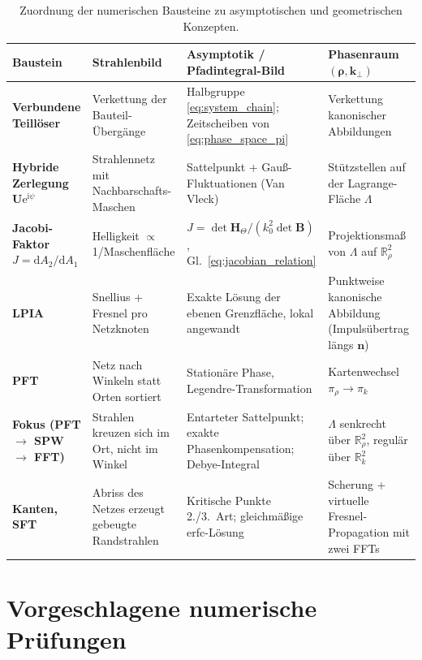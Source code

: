 \documentclass[11pt,a4paper]{scrartcl}
\theoremstyle{insightstyle}
\newcommand{\dd}{\mathrm{d}}
\newcommand{\ii}{\mathrm{i}}
\newcommand{\ee}{\mathrm{e}}
\newcommand{\R}{\mathbb{R}}
\newcommand{\Hess}{\bm{H}}
\newcommand{\rh}{\bm{\rho}}
\newcommand{\kp}{\bm{k}_\perp}
\begin{document}
\begin{table}[htbp]
\centering
\renewcommand{\arraystretch}{1.35}
\small
\begin{tabularx}{\textwidth}{>{\raggedright\arraybackslash\bfseries}p{2.9cm} >{\raggedright\arraybackslash}X >{\raggedright\arraybackslash}X >{\raggedright\arraybackslash}X}
\toprule
Baustein & Strahlenbild & Asymptotik / Pfadintegral-Bild & Phasenraum $(\rh,\kp)$\\
\midrule
Verbundene Teillöser & Verkettung der Bauteil-Übergänge & Halbgruppe \eqref{eq:system_chain}; Zeitscheiben von \eqref{eq:phase_space_pi} & Verkettung kanonischer Abbildungen\\
\addlinespace
Hybride Zerlegung $\bm U\ee^{\ii\psi}$ & Strahlennetz mit Nachbarschafts-Maschen & Sattelpunkt + Gauß-Fluktuationen (Van Vleck) & Stützstellen auf der Lagrange-Fläche $\Lambda$\\
\addlinespace
Jacobi-Faktor $J=\dd A_2/\dd A_1$ & Helligkeit $\propto$ 1/Maschenfläche & $J=\det\Hess_\Theta/(k_0^2\det\bm B)$, Gl.~\eqref{eq:jacobian_relation} & Projektionsmaß von $\Lambda$ auf $\R^2_\rho$\\
\addlinespace
LPIA & Snellius + Fresnel pro Netzknoten & Exakte Lösung der ebenen Grenzfläche, lokal angewandt & Punktweise kanonische Abbildung (Impulsübertrag längs $\bm n$)\\
\addlinespace
PFT & Netz nach Winkeln statt Orten sortiert & Stationäre Phase, Legendre-Transformation & Kartenwechsel $\pi_\rho\to\pi_k$\\
\addlinespace
Fokus (PFT $\to$ SPW $\to$ FFT) & Strahlen kreuzen sich im Ort, nicht im Winkel & Entarteter Sattelpunkt; exakte Phasenkompensation; Debye-Integral & $\Lambda$ senkrecht über $\R^2_\rho$, regulär über $\R^2_k$\\
\addlinespace
Kanten, SFT & Abriss des Netzes erzeugt gebeugte Randstrahlen & Kritische Punkte 2./3.~Art; gleichmäßige erfc-Lösung & Scherung + virtuelle Fresnel-Propagation mit zwei FFTs\\
\bottomrule
\end{tabularx}
\caption{Zuordnung der numerischen Bausteine zu asymptotischen und geometrischen Konzepten.}
\label{tab:mapping}
\end{table}

\section{Vorgeschlagene numerische Prüfungen}
\end{document}
